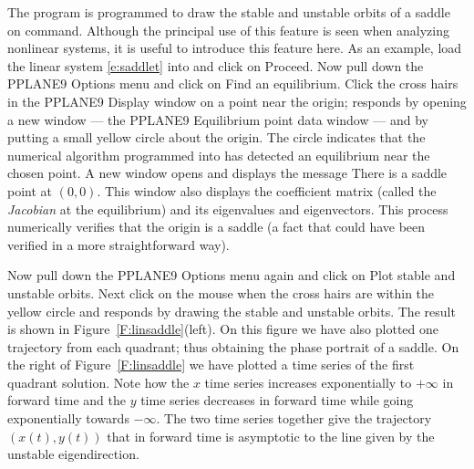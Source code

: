 \documentclass{ximera}
\begin{document}
The program {\pplane} is programmed to draw the stable and unstable
orbits of a saddle on command. Although the principal use of this
feature is seen when analyzing nonlinear systems, it is useful to
introduce this feature here.  As an example, load the linear system
\eqref{e:saddlet} into {\pplane} and click on {\sf Proceed}.  Now
pull down the {\sf PPLANE9 Options} menu and click on {\sf Find an
equilibrium}.  Click the cross hairs in the {\sf PPLANE9 Display}
window on a point near the origin; {\pplane} responds by
opening a new window --- the {\sf PPLANE9 Equilibrium point data}
window --- and by putting a small yellow circle about the
origin.  The circle indicates that the numerical algorithm
programmed into {\pplane} has detected an equilibrium near
the chosen point. A new window opens and displays the message
{\sf There is a saddle point at} $(0,0)$.  This window also displays the
coefficient matrix (called the {\em Jacobian} at the equilibrium) and its eigenvalues
and eigenvectors.  This process numerically verifies that the origin
is a saddle (a fact that could have been verified in a more
straightforward way).

Now pull down the {\sf PPLANE9 Options} menu again and click on
{\sf Plot stable and unstable orbits}.  Next click on the mouse
when the cross hairs are within the yellow circle and {\sf
\pplane} responds by drawing the stable and unstable orbits.
The result is shown in Figure~\ref{F:linsaddle}(left).
On this figure we have also plotted one trajectory
from each quadrant; thus obtaining the phase portrait of a saddle.
On the right of Figure~\ref{F:linsaddle} we have plotted a
time series of the first quadrant solution.  Note how the $x$
time series increases exponentially to $+\infty$ in forward time and 
the $y$ time series decreases in forward time while going exponentially 
towards $-\infty$.  The two time series together
give the trajectory $(x(t),y(t))$ that in forward time is asymptotic
to the line given by the unstable eigendirection.





\end{document}
